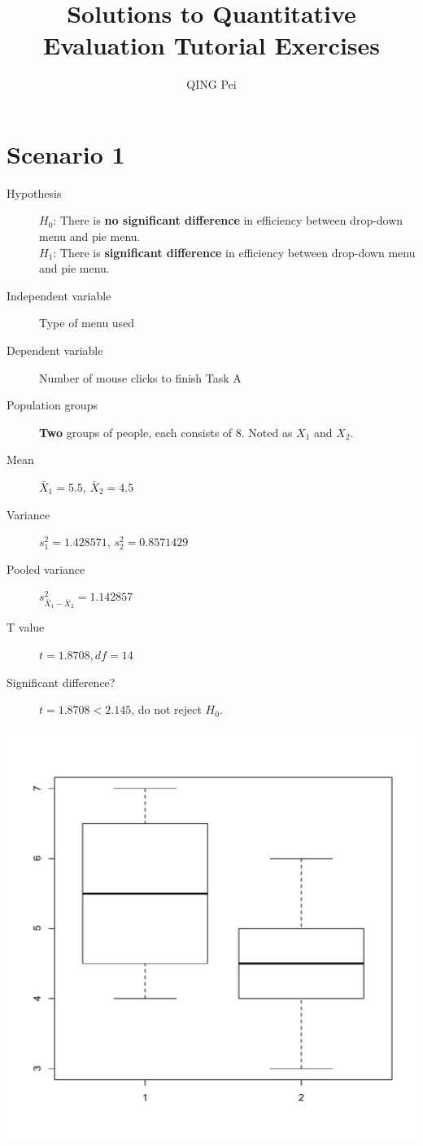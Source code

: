 \documentclass[a4paper,10pt,twocolumn]{article}
\author{QING Pei}
\title{Solutions to Quantitative Evaluation Tutorial Exercises}
\begin{document}
\maketitle

\tableofcontents

\section{Scenario 1} %
\label{sec:scenario_1}
\begin{description}
	\item[Hypothesis] 
		$H_0$: There is \textbf{no significant difference} in efficiency between drop-down menu and pie menu.\\
		$H_1$: There is \textbf{significant difference} in efficiency between drop-down menu and pie menu.
	\item[Independent variable] Type of menu used
	\item[Dependent variable] Number of mouse clicks to finish Task A
	\item[Population groups] \textbf{Two} groups of people, each consists of 8. Noted as $X_1$ and $X_2$.
	\item[Mean] $\bar{X}_1=5.5$, $\bar{X}_2=4.5$
	\item[Variance] $s_1^2=1.428571$, $s_2^2=0.8571429$
	\item[Pooled variance] $s_{\bar{X}_1-\bar{X}_2}^2=1.142857$
	\item[T value] $t = 1.8708, df = 14$
	\item[Significant difference?] $t = 1.8708 < 2.145$, do not reject $H_0$.
\end{description}
\includegraphics[width=.5\textwidth]{s1.pdf}
\end{document}
